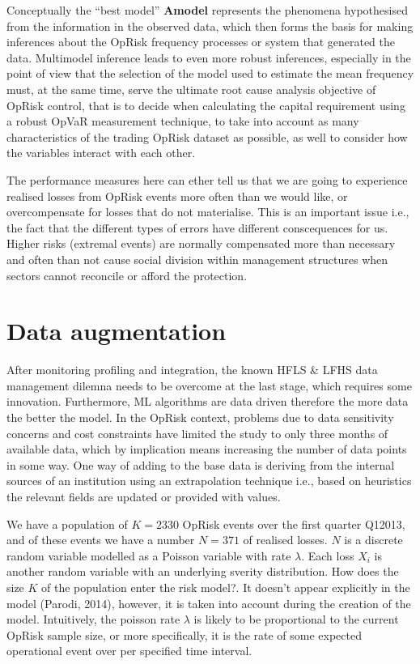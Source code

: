 \documentclass{DissertateUSU}
\begin{document}
Conceptually the ``best model'' \textbf{Amodel} represents the phenomena
hypothesised from the information in the observed data, which then forms
the basis for making inferences about the OpRisk frequency processes or
system that generated the data. Multimodel inference leads to even more
robust inferences, especially in the point of view that the selection of
the model used to estimate the mean frequency must, at the same time,
serve the ultimate root cause analysis objective of OpRisk control, that
is to decide when calculating the capital requirement using a robust
OpVaR measurement technique, to take into account as many
characteristics of the trading OpRisk dataset as possible, as well to
consider how the variables interact with each other.\medskip

The performance measures here can ether tell us that we are going to
experience realised losses from OpRisk events more often than we would
like, or overcompensate for losses that do not materialise. This is an
important issue i.e., the fact that the different types of errors have
different conscequences for us. Higher risks (extremal events) are
normally compensated more than necessary and often than not cause social
division within management structures when sectors cannot reconcile or
afford the protection.

\section{Data augmentation}

After monitoring profiling and integration, the known HFLS \& LFHS data
management dilemna needs to be overcome at the last stage, which
requires some innovation. Furthermore, ML algorithms are data driven
therefore the more data the better the model. In the OpRisk context,
problems due to data sensitivity concerns and cost constraints have
limited the study to only three months of available data, which by
implication means increasing the number of data points in some way. One
way of adding to the base data is deriving from the internal sources of
an institution using an extrapolation technique i.e., based on
heuristics the relevant fields are updated or provided with
values.\medskip 

We have a population of \(K = 2330\) OpRisk events over the first
quarter Q12013, and of these events we have a number \(N = 371\) of
realised losses. \(N\) is a discrete random variable modelled as a
Poisson variable with rate \(\lambda\). Each loss \(X_i\) is another
random variable with an underlying sverity distribution. How does the
size \(K\) of the population enter the risk model?. It doesn't appear
explicitly in the model (Parodi, 2014), however, it is taken into
account during the creation of the model. Intuitively, the poisson rate
\(\lambda\) is likely to be proportional to the current OpRisk sample
size, or more specifically, it is the rate of some expected operational
event over per specified time interval.\medskip
\end{document}
